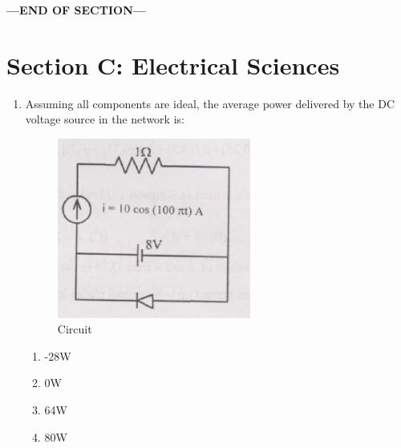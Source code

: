 \documentclass[journal,cmex10]{IEEEtran}
\theoremstyle{remark}
\numberwithin{equation}{enumi}
\numberwithin{figure}{enumi}
\begin{document}
    \vspace{3\baselineskip}
    \begin{center}
    \textbf{\Large ---END OF SECTION---}
    \end{center}

\newpage

\section*{Section C: Electrical Sciences}
\vspace{2\baselineskip}
\begin{enumerate}[label=\arabic*)]

    \item Assuming all components are ideal, the average power delivered by the DC voltage source in the network is:
    
    \begin{figure}[htbp]
  \centering
  \includegraphics[width=0.6\textwidth]{figs/C/fig1.png}
  \caption{Circuit}
  \label{C/figs1.png}
\end{figure}
    \bigskip
    \hfill {}
    \begin{enumerate}[label=\alph*)]
        \item -28W
        \item 0W
        \item 64W
        \item 80W
    \end{enumerate}
    \newpage


\end{enumerate}
\end{document}
